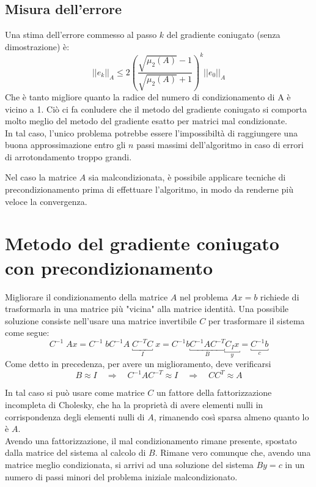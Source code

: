 \subsection{Misura dell'errore} Una stima dell'errore commesso al
passo $k$ del gradiente coniugato (senza dimostrazione) \`e:
$$
||e_{k}||_{A} \leq 2 \left( \frac{
\sqrt{\mu_{2}(A)}-1}{\sqrt{\mu_{2}(A)}+1} \right)^{k}
||e_{0}||_{A}
$$
Che \`e tanto migliore quanto la radice del numero di condizionamento di
A \`e vicino a 1. Ciò ci fa conludere che il metodo del gradiente
coniugato si comporta molto meglio del metodo del gradiente esatto per
matrici mal condizionate.\\ In tal caso, l'unico problema potrebbe
essere l'impossibiltà di raggiungere una buona approssimazione entro
gli $n$ passi massimi dell'algoritmo in caso di errori di
arrotondamento troppo grandi.

Nel caso la matrice $A$ sia malcondizionata, \`e possibile applicare
tecniche di precondizionamento prima di effettuare l'algoritmo, in
modo da renderne più veloce la convergenza.
 
\section{Metodo del gradiente coniugato con precondizionamento} Migliorare il
condizionamento della matrice $A$ nel problema $Ax=b$ richiede
di trasformarla in una matrice più "vicina" alla matrice identità. Una
possibile soluzione consiste nell'usare una matrice invertibile $C$
per trasformare il sistema come segue:
$$
C^{-1}\; Ax = C^{-1}\; b C^{-1}A \; \underbracket{C^{-T}C}_{I} \; x =
C^{-1}b \underbracket{C^{-1}AC^{-T}}_{B} \underbracket{C_{I} x}_{y} =
\underbracket{C^{-1}b}_{c}
$$
Come detto in precedenza, per avere un miglioramento, deve verificarsi
$$
B \approx I \quad \Longrightarrow \quad C^{-1}AC^{-T} \approx I \quad
\Longrightarrow \quad CC^{T} \approx A
$$

In tal caso si può usare come matrice $C$ un fattore della
fattorizzazione incompleta di Cholesky, che ha la proprietà di avere
elementi nulli in corrispondenza degli elementi nulli di $A$,
rimanendo così sparsa almeno quanto lo \`e $A$. \\ Avendo una
fattorizzazione, il mal condizionamento rimane presente, spostato
dalla matrice del sistema al calcolo di $B$.  Rimane vero comunque
che, avendo una matrice meglio condizionata, si arrivi ad una
soluzione del sistema $By=c$ in un numero di passi minori del problema
iniziale malcondizionato.

